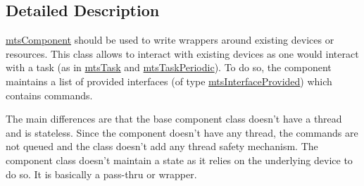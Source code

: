 \subsection{Detailed Description}
\hyperlink{classmts_component}{mts\-Component} should be used to write wrappers around existing devices or resources. This class allows to interact with existing devices as one would interact with a task (as in \hyperlink{classmts_task}{mts\-Task} and \hyperlink{classmts_task_periodic}{mts\-Task\-Periodic}). To do so, the component maintains a list of provided interfaces (of type \hyperlink{classmts_interface_provided}{mts\-Interface\-Provided}) which contains commands.

The main differences are that the base component class doesn't have a thread and is stateless. Since the component doesn't have any thread, the commands are not queued and the class doesn't add any thread safety mechanism. The component class doesn't maintain a state as it relies on the underlying device to do so. It is basically a pass-\/thru or wrapper. 

